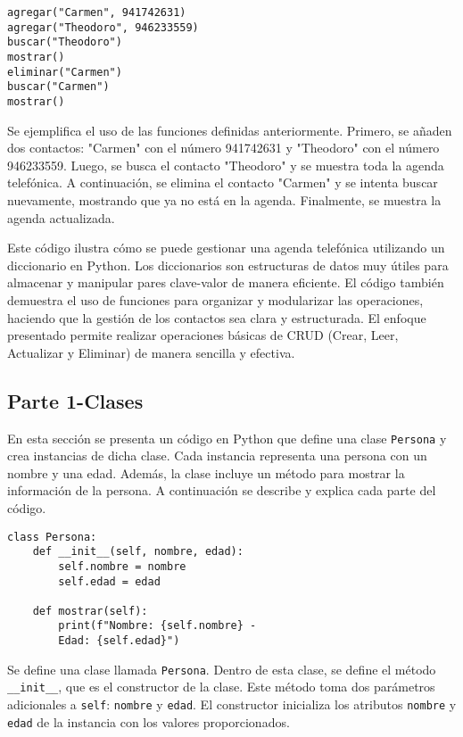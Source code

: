 \documentclass[conference]{IEEEtran}
\begin{document}
\begin{verbatim}
agregar("Carmen", 941742631)
agregar("Theodoro", 946233559)
buscar("Theodoro")
mostrar()
eliminar("Carmen")
buscar("Carmen")
mostrar()
\end{verbatim}

Se ejemplifica el uso de las funciones definidas anteriormente. Primero, se añaden dos contactos: "Carmen" con el número 941742631 y "Theodoro" con el número 946233559. Luego, se busca el contacto "Theodoro" y se muestra toda la agenda telefónica. A continuación, se elimina el contacto "Carmen" y se intenta buscar nuevamente, mostrando que ya no está en la agenda. Finalmente, se muestra la agenda actualizada.

Este código ilustra cómo se puede gestionar una agenda telefónica utilizando un diccionario en Python. Los diccionarios son estructuras de datos muy útiles para almacenar y manipular pares clave-valor de manera eficiente. El código también demuestra el uso de funciones para organizar y modularizar las operaciones, haciendo que la gestión de los contactos sea clara y estructurada. El enfoque presentado permite realizar operaciones básicas de CRUD (Crear, Leer, Actualizar y Eliminar) de manera sencilla y efectiva.


\subsection{Parte 1-Clases}

En esta sección se presenta un código en Python que define una clase \texttt{Persona} y crea instancias de dicha clase. Cada instancia representa una persona con un nombre y una edad. Además, la clase incluye un método para mostrar la información de la persona. A continuación se describe y explica cada parte del código.

\begin{verbatim}
class Persona:
    def __init__(self, nombre, edad):
        self.nombre = nombre
        self.edad = edad

    def mostrar(self):
        print(f"Nombre: {self.nombre} -
        Edad: {self.edad}")
\end{verbatim}

Se define una clase llamada \texttt{Persona}. Dentro de esta clase, se define el método \texttt{\_\_init\_\_}, que es el constructor de la clase. Este método toma dos parámetros adicionales a \texttt{self}: \texttt{nombre} y \texttt{edad}. El constructor inicializa los atributos \texttt{nombre} y \texttt{edad} de la instancia con los valores proporcionados.
\end{document}
